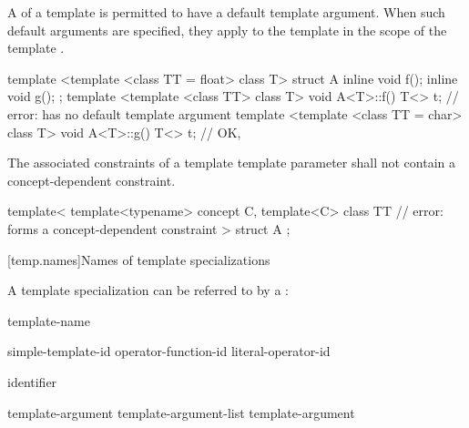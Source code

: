 \pnum
A  of
a template 
is permitted to have a default template argument.
When such default arguments are specified,
they apply to the template 
in the scope of the template .
\begin{example}
\begin{codeblock}
template <template <class TT = float> class T> struct A {
  inline void f();
  inline void g();
};
template <template <class TT> class T> void A<T>::f() {
  T<> t;            // error:  has no default template argument
}
template <template <class TT = char> class T> void A<T>::g() {
  T<> t;            // OK, 
}
\end{codeblock}
\end{example}
The associated constraints of a template template parameter
shall not contain a concept-dependent constraint.
\begin{example}
\begin{codeblock}
template<
  template<typename> concept C,
  template<C> class TT  // error:  forms a concept-dependent constraint
>
struct A {};
\end{codeblock}
\end{example}

[temp.names]{Names of template specializations}

\pnum
A template specialization can be referred to by a
:

\begin{bnf}
\br
  template-name \terminal{<}  \terminal{>}
\end{bnf}

\begin{bnf}
\br
  simple-template-id\br
  operator-function-id \terminal{<}  \terminal{>}\br
  literal-operator-id \terminal{<}  \terminal{>}
\end{bnf}

\begin{bnf}
\br
  identifier
\end{bnf}

\begin{bnf}
\br
  template-argument \br
  template-argument-list \terminal{,} template-argument 
\end{bnf}

